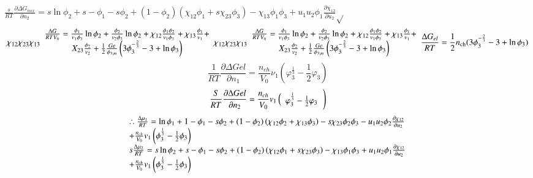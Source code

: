 \documentclass{article} %
\begin{document}
\noindent 
{\bf $\frac{s}{RT} \frac{\partial \Delta G_{mix} }{\partial n_{2} } =s\ln \phi _{2} +s-\phi _{1} -s\phi _{2} +(1-\phi _{2} )\left(\chi _{12} \phi _{1} +s\chi _{23} \phi _{3} \right)-\chi _{13} \phi _{1} \phi _{3} +u_{1} u_{2} \phi _{1} \frac{\partial \chi _{12} }{\partial u_{2} } $$\mathrm{\sqrt{}}$
\[\chi _{12} \chi _{23} \chi _{13} \begin{array}{c} {\frac{{\rm \Delta }G}{RTV_{0} } =\frac{\phi _{1} }{v_{1} \phi _{3} } \ln \phi _{2} +\frac{\phi _{2} }{v_{2} \phi _{3} } \ln \phi _{2} +\chi _{12} \frac{\phi _{1} \phi _{2} }{v_{1} \phi _{3} } +\chi _{13} \frac{\phi _{1} }{v_{1} } +} \\ {X_{23} \frac{\phi _{2} }{v_{2} } +\frac{1}{2} \frac{Ge}{\phi _{3,m} } \left(3\phi _{3}^{-\frac{2}{3} } -3+\ln \phi _{3} \right)} \end{array}\chi _{12} \chi _{23} \chi _{13} \begin{array}{c} {\frac{{\rm \Delta }G}{RTV_{0} } =\frac{\phi _{1} }{v_{1} \phi _{3} } \ln \phi _{2} +\frac{\phi _{2} }{v_{2} \phi _{3} } \ln \phi _{2} +\chi _{12} \frac{\phi _{1} \phi _{2} }{v_{1} \phi _{3} } +\chi _{13} \frac{\phi _{1} }{v_{1} } +} \\ {X_{23} \frac{\phi _{2} }{v_{2} } +\frac{1}{2} \frac{Ge}{\phi _{3,m} } \left(3\phi _{3}^{-\frac{2}{3} } -3+\ln \phi _{3} \right)} \end{array}\frac{{\rm \Delta }G_{el} }{RT} =\frac{1}{2} n_{{\rm ch}} (3\phi _{3}^{-\frac{2}{3} } -3+\ln \phi _{3} )\] 
\[\frac{1}{RT} \frac{\partial \Delta Gel}{\partial n_{1} } =\frac{n_{ch} }{V_{0} } \nu _{1} \left(\varphi _{3}^{\frac{1}{3} } -\frac{1}{2} \varphi _{3} \right)\] 
\[\left. \frac{S}{RT} \frac{\partial {\rm \Delta }Gel}{\partial n_{2} } =\frac{n_{ch} }{V_{0} } v_{1} \left(\begin{array}{c} {\varphi _{3}^{\frac{1}{3} } -\frac{1}{2} \varphi _{3} } \end{array}\right. \right)\] 
\[\begin{array}{l} {\therefore \frac{{\rm \Delta }\mu _{1} }{RT} =\ln \phi _{1} +1-\phi _{1} -s\phi _{2} +(1-\phi _{2} )\left(\chi _{12} \phi _{2} +\chi _{13} \phi _{3} \right)-s\chi _{23} \phi _{2} \phi _{3} -u_{1} u_{2} \phi _{2} \frac{\partial \chi _{12} }{\partial u_{2} } } \\ {+\frac{n_{ch} }{V_{0} } v_{1} \left(\phi _{3}^{\frac{1}{3} } -\frac{1}{2} \phi _{3} \right)} \\ {s\frac{{\rm \Delta }\mu _{2} }{RT} =s\ln \phi _{2} +s-\phi _{1} -s\phi _{2} +(1-\phi _{2} )\left(\chi _{12} \phi _{1} +s\chi _{23} \phi _{3} \right)-\chi _{13} \phi _{1} \phi _{3} +u_{1} u_{2} \phi _{1} \frac{\partial \chi _{12} }{\partial u_{2} } } \\ {+\frac{n_{ch} }{V_{0} } v_{1} \left(\phi _{3}^{\frac{1}{3} } -\frac{1}{2} \phi _{3} \right)} \end{array}\] }
\end{document}
